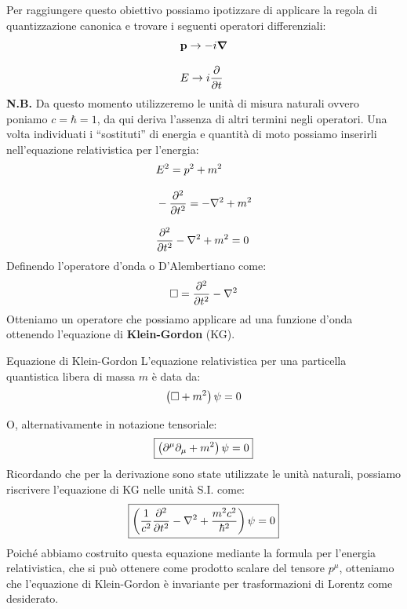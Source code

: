 Per raggiungere questo obiettivo possiamo ipotizzare di applicare la regola di quantizzazione canonica e trovare i seguenti operatori differenziali:
\begin{equation}
    \begin{split}
        &\vec{p} \rightarrow -i\grad \\[8pt]
        &E \rightarrow i\pdv{}{t}
    \end{split}
\end{equation}
\textbf{N.B.} Da questo momento utilizzeremo le unità di misura naturali ovvero poniamo $c = \hbar = 1$, da qui deriva l'assenza di altri termini negli operatori.
Una volta individuati i ``sostituti'' di energia e quantità di moto possiamo inserirli nell'equazione relativistica per l'energia:
\begin{equation}
    \begin{split}
        &E^2 = p^2 + m^2 \\[8pt]
        &-\pdv[2]{}{t} = -\lap + m^2 \\[8pt]
        &\pdv[2]{}{t} -\lap + m^2 = 0
    \end{split}
\end{equation}
Definendo l'operatore d'onda o D'Alembertiano come:
\begin{equation}
    \dalop = \pdv[2]{}{t} -\lap
\end{equation}
Otteniamo un operatore che possiamo applicare ad una funzione d'onda ottenendo l'equazione di \textbf{Klein-Gordon} (KG).
\begin{theorem}{Equazione di Klein-Gordon}
    L'equazione relativistica per una particella quantistica libera di massa $m$ è data da:
    \begin{equation}
        \left(\square + m^2\right)\psi = 0
    \end{equation}
\end{theorem}
O, alternativamente in notazione tensoriale:
\begin{equation}
    \boxed{\left(\partial^\mu\partial_\mu + m^2\right) \psi = 0}
\end{equation}
Ricordando che per la derivazione sono state utilizzate le unità naturali, possiamo riscrivere l'equazione di KG nelle unità S.I. come:
\begin{equation}
    \boxed{\brackets{\dfrac{1}{c^2}\pdv[2]{}{t} - \lap + \dfrac{m^2 c^2}{\hbar^2}} \psi = 0}
\end{equation}
Poiché abbiamo costruito questa equazione mediante la formula per l'energia relativistica, che si può ottenere come prodotto scalare del tensore $p^\mu$, otteniamo che l'equazione di Klein-Gordon è invariante per trasformazioni di Lorentz come desiderato.\\
